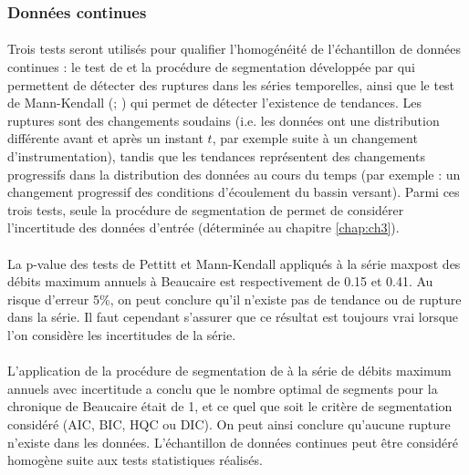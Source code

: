	\subsubsection{Données continues}
	
	\paragraph{} Trois tests seront utilisés pour qualifier l'homogénéité de l'échantillon de données continues : le test de \citet{pettitt_non-parametric_1979} et la procédure de segmentation développée par \citet{darienzo_detection_2021-1} qui permettent de détecter des ruptures dans les séries temporelles, ainsi que le test de Mann-Kendall (\cite{mann_nonparametric_1945}; \cite{kendall_rank_1948}) qui permet de détecter l'existence de tendances. Les ruptures sont des changements soudains (i.e. les données ont une distribution différente avant et après un instant $t$, par exemple suite à un changement d'instrumentation), tandis que les tendances représentent des changements progressifs dans la distribution des données au cours du temps (par exemple : un changement progressif des conditions d'écoulement du bassin versant). Parmi ces trois tests, seule la procédure de segmentation de \citet{darienzo_detection_2021-1} permet de considérer l'incertitude des données d'entrée (déterminée au chapitre \ref{chap:ch3}).
	
	\paragraph{} La p-value des tests de Pettitt et Mann-Kendall appliqués à la série maxpost des débits maximum annuels à Beaucaire est respectivement de 0.15 et 0.41. Au risque d'erreur 5\%, on peut conclure qu'il n'existe pas de tendance ou de rupture dans la série. Il faut cependant s'assurer que ce résultat est toujours vrai lorsque l'on considère les incertitudes de la série.
			
	\paragraph{} L'application de la procédure de segmentation de \citet{darienzo_detection_2021-1} à la série de débits maximum annuels avec incertitude a conclu que le nombre optimal de segments pour la chronique de Beaucaire était de 1, et ce quel que soit le critère de segmentation considéré (AIC, BIC, HQC ou DIC). On peut ainsi conclure qu'aucune rupture n'existe dans les données. L'échantillon de données continues peut être considéré homogène suite aux tests statistiques réalisés. 
	
